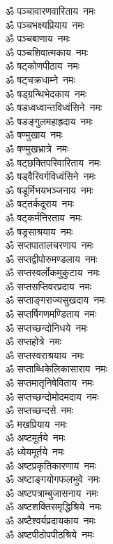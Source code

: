 \begin{multicols}{2}
\begin{flushleft}
ॐ पञ्चावारणवारिताय~नमः\\
ॐ पञ्चभक्ष्यप्रियाय~नमः\\
ॐ पञ्चबाणाय~नमः\\
ॐ पञ्चशिवात्मकाय~नमः\hfill{}\\
ॐ षट्कोणपीठाय~नमः\\
ॐ षट्चक्रधाम्ने~नमः\\
ॐ षड्ग्रन्थिभेदकाय~नमः\\
ॐ षडध्वध्वान्तविध्वंसिने~नमः\\
ॐ षडङ्गुलमहाह्रदाय~नमः\\
ॐ षण्मुखाय~नमः\\
ॐ षण्मुखभ्रात्रे~नमः\\
ॐ षट्छक्तिपरिवारिताय~नमः\\
ॐ षड्वैरिवर्गविध्वंसिने~नमः\\
ॐ षडूर्मिभयभञ्जनाय~नमः\hfill{}\\
ॐ षट्तर्कदूराय~नमः\\
ॐ षट्कर्मनिरताय~नमः\\
ॐ षड्रसाश्रयाय~नमः\\
ॐ सप्तपातालचरणाय~नमः\\
ॐ सप्तद्वीपोरुमण्डलाय~नमः\\
ॐ सप्तस्वर्लोकमुकुटाय~नमः\\
ॐ सप्तसप्तिवरप्रदाय~नमः\\
ॐ सप्ताङ्गराज्यसुखदाय~नमः\\
ॐ सप्तर्षिगणमण्डिताय~नमः\\
ॐ सप्तच्छन्दोनिधये~नमः\hfill{}\\
ॐ सप्तहोत्रे~नमः\\
ॐ सप्तस्वराश्रयाय~नमः\\
ॐ सप्ताब्धिकेलिकासाराय~नमः\\
ॐ सप्तमातृनिषेविताय~नमः\\
ॐ सप्तच्छन्दोमोदमदाय~नमः\\
ॐ सप्तच्छन्दसे~नमः\\
ॐ मखप्रियाय~नमः\\
ॐ अष्टमूर्तये~नमः\\
ॐ ध्येयमूर्तये~नमः\\
ॐ अष्टप्रकृतिकारणाय~नमः\hfill{}\\
ॐ अष्टाङ्गयोगफलभुवे~नमः\\
ॐ अष्टपत्राम्बुजासनाय~नमः\\
ॐ अष्टशक्तिसमृद्धिश्रिये~नमः\\
ॐ अष्टैश्वर्यप्रदायकाय~नमः\\
ॐ अष्टपीठोपपीठश्रिये~नमः\\

\end{flushleft}
\end{multicols}

